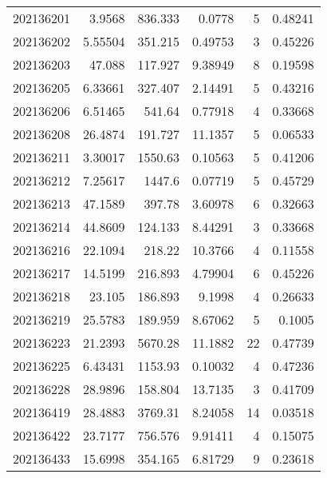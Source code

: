 \begin{tabular}{rrrrrr}
 202136201 &          3.9568  &      836.333  &            0.0778  &           5 & 0.48241 \\
 202136202 &          5.55504 &      351.215  &            0.49753 &           3 & 0.45226 \\
 202136203 &         47.088   &      117.927  &            9.38949 &           8 & 0.19598 \\
 202136205 &          6.33661 &      327.407  &            2.14491 &           5 & 0.43216 \\
 202136206 &          6.51465 &      541.64   &            0.77918 &           4 & 0.33668 \\
 202136208 &         26.4874  &      191.727  &           11.1357  &           5 & 0.06533 \\
 202136211 &          3.30017 &     1550.63   &            0.10563 &           5 & 0.41206 \\
 202136212 &          7.25617 &     1447.6    &            0.07719 &           5 & 0.45729 \\
 202136213 &         47.1589  &      397.78   &            3.60978 &           6 & 0.32663 \\
 202136214 &         44.8609  &      124.133  &            8.44291 &           3 & 0.33668 \\
 202136216 &         22.1094  &      218.22   &           10.3766  &           4 & 0.11558 \\
 202136217 &         14.5199  &      216.893  &            4.79904 &           6 & 0.45226 \\
 202136218 &         23.105   &      186.893  &            9.1998  &           4 & 0.26633 \\
 202136219 &         25.5783  &      189.959  &            8.67062 &           5 & 0.1005  \\
 202136223 &         21.2393  &     5670.28   &           11.1882  &          22 & 0.47739 \\
 202136225 &          6.43431 &     1153.93   &            0.10032 &           4 & 0.47236 \\
 202136228 &         28.9896  &      158.804  &           13.7135  &           3 & 0.41709 \\
 202136419 &         28.4883  &     3769.31   &            8.24058 &          14 & 0.03518 \\
 202136422 &         23.7177  &      756.576  &            9.91411 &           4 & 0.15075 \\
 202136433 &         15.6998  &      354.165  &            6.81729 &           9 & 0.23618 \\

\end{tabular}
